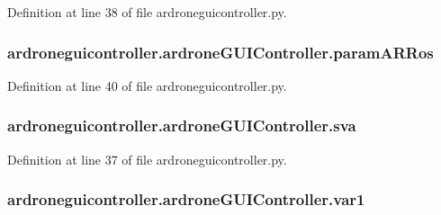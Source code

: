 Definition at line 38 of file ardroneguicontroller.\-py.

\hypertarget{classardroneguicontroller_1_1ardroneGUIController_ad33c0ce0f9c7165b3f13902fb442d4cf}{
\subsubsection[{param\-A\-R\-Ros}]{\setlength{\rightskip}{0pt plus 5cm}ardroneguicontroller.\-ardrone\-G\-U\-I\-Controller.\-param\-A\-R\-Ros}}\label{classardroneguicontroller_1_1ardroneGUIController_ad33c0ce0f9c7165b3f13902fb442d4cf}


Definition at line 40 of file ardroneguicontroller.\-py.

\hypertarget{classardroneguicontroller_1_1ardroneGUIController_a2da70796992fd86e7caac4a30f1fc60c}{
\subsubsection[{sva}]{\setlength{\rightskip}{0pt plus 5cm}ardroneguicontroller.\-ardrone\-G\-U\-I\-Controller.\-sva}}\label{classardroneguicontroller_1_1ardroneGUIController_a2da70796992fd86e7caac4a30f1fc60c}


Definition at line 37 of file ardroneguicontroller.\-py.

\hypertarget{classardroneguicontroller_1_1ardroneGUIController_a63bd23277a5f31cdc1f1465c4222c389}{
\subsubsection[{var1}]{\setlength{\rightskip}{0pt plus 5cm}ardroneguicontroller.\-ardrone\-G\-U\-I\-Controller.\-var1}}\label{classardroneguicontroller_1_1ardroneGUIController_a63bd23277a5f31cdc1f1465c4222c389}


